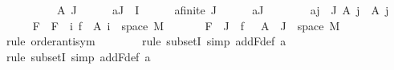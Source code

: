 \begin{isabellebody}
\ \ \isamarkupfalse%
\ {\isacharminus}{\kern0pt}\isanewline
\ \ \ \ \isamarkupfalse%
\ A{\isacharprime}{\kern0pt}\ J\isanewline
\ \ \ \ \isamarkupfalse%
\ a{}{\isacharcolon}{\kern0pt}{\isachardoublequoteopen}J\ {\isasymsubseteq}\ I{\isachardoublequoteclose}\isanewline
\ \ \ \ \isamarkupfalse%
\ a{}{\isacharcolon}{\kern0pt}{\isachardoublequoteopen}finite\ J{\isachardoublequoteclose}\isanewline
\ \ \ \ \isamarkupfalse%
\ a{}{\isacharcolon}{\kern0pt}{\isachardoublequoteopen}J\ {\isasymnoteq}\ {\isacharbraceleft}{\kern0pt}{\isacharbraceright}{\kern0pt}{\isachardoublequoteclose}\isanewline
\ \ \ \ \isamarkupfalse%
\ a{}{\isacharcolon}{\kern0pt}{\isachardoublequoteopen}{\isasymforall}j\ {\isasymin}\ J{\isachardot}{\kern0pt}\ A{\isacharprime}{\kern0pt}\ j\ {\isasymin}\ A\ j{\isachardoublequoteclose}\isanewline
\isanewline
\ \ \ \ \isamarkupfalse%
\ F{\isacharprime}{\kern0pt}\ \ {\isachardoublequoteopen}F{\isacharprime}{\kern0pt}\ {\isacharequal}{\kern0pt}\ {\isacharparenleft}{\kern0pt}{\isasymlambda}i{\isachardot}{\kern0pt}\ f\ {\isacharminus}{\kern0pt}{\isacharbackquote}{\kern0pt}\ A{\isacharprime}{\kern0pt}\ i\ {\isasyminter}\ space\ M{\isacharparenright}{\kern0pt}{\isachardoublequoteclose}\isanewline
\isanewline
\ \ \ \ \isamarkupfalse%
\ {\isachardoublequoteopen}{\isasymInter}\ {\isacharparenleft}{\kern0pt}F{\isacharprime}{\kern0pt}\ {\isacharbackquote}{\kern0pt}\ J{\isacharparenright}{\kern0pt}\ {\isacharequal}{\kern0pt}\ f\ {\isacharminus}{\kern0pt}{\isacharbackquote}{\kern0pt}\ {\isacharparenleft}{\kern0pt}{\isasymInter}\ {\isacharparenleft}{\kern0pt}A{\isacharprime}{\kern0pt}\ {\isacharbackquote}{\kern0pt}\ J{\isacharparenright}{\kern0pt}{\isacharparenright}{\kern0pt}\ {\isasyminter}\ space\ M{\isachardoublequoteclose}\ \isanewline
\ \ \ \ \ \ \isamarkupfalse%
\ {\isacharparenleft}{\kern0pt}rule\ order{\isacharunderscore}{\kern0pt}antisym{\isacharparenright}{\kern0pt}\isanewline
\ \ \ \ \ \ \isamarkupfalse%
\ {\isacharparenleft}{\kern0pt}rule\ subsetI{\isacharcomma}{\kern0pt}\ simp\ add{\isacharcolon}{\kern0pt}F{\isacharprime}{\kern0pt}{\isacharunderscore}{\kern0pt}def\ a{}{\isacharparenright}{\kern0pt}\isanewline
\ \ \ \ \ \ \isamarkupfalse%
\ {\isacharparenleft}{\kern0pt}rule\ subsetI{\isacharcomma}{\kern0pt}\ simp\ add{\isacharcolon}{\kern0pt}F{\isacharprime}{\kern0pt}{\isacharunderscore}{\kern0pt}def\ a{}{\isacharparenright}{\kern0pt}\isanewline

\end{isabellebody}
